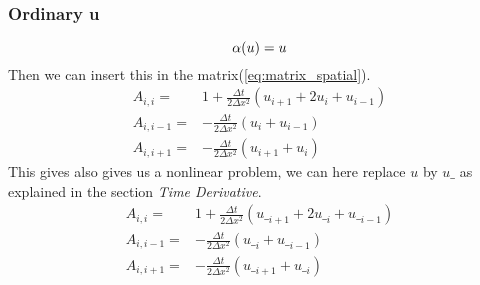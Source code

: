 \documentclass[norsk,11pt,a4paper]{article}
\begin{document}
\subsubsection*{Ordinary u}
\begin{equation}
	\alpha(u) = u\\
\end{equation}
Then we can insert this in the matrix(\ref{eq:matrix_spatial}).
\begin{align*} 
A_{i,i} =& 1+\frac{\Delta t}{2\Delta x^2}(u_{i+1}+2u_{i}+u_{i-1})\\
A_{i,i-1} =&-\frac{\Delta t}{2\Delta x^2}(u_{i}+u_{i-1})\\
A_{i,i+1} =&-\frac{\Delta t}{2\Delta x^2}(u_{i+1}+u_{i})
\end{align*}                               
This gives also gives us a nonlinear problem, we can here replace $u$ by $u\_$
as explained in the section \emph{Time Derivative}.
\begin{align*} 
A_{i,i} =& 1+\frac{\Delta t}{2\Delta x^2}(u\__{i+1}+2u\__{i}+u\__{i-1})\\
A_{i,i-1} =&-\frac{\Delta t}{2\Delta x^2}(u\__{i}+u\__{i-1})\\
A_{i,i+1} =&-\frac{\Delta t}{2\Delta x^2}(u\__{i+1}+u\__{i})
\end{align*}                               
\end{document}
